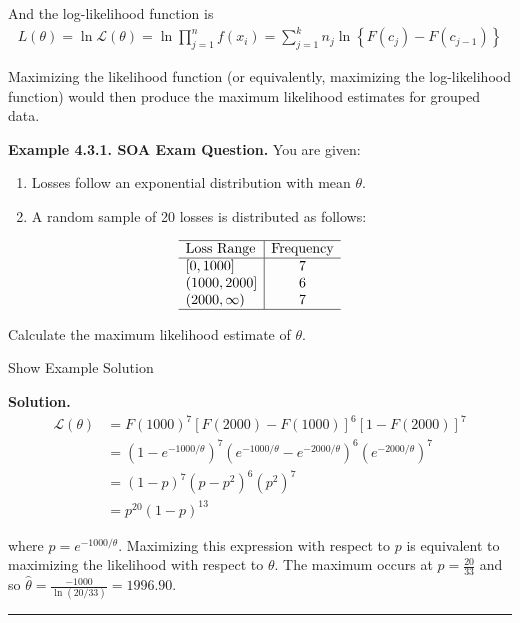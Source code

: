 \documentclass[]{book}
\providecommand{\tightlist}{%
  \setlength{\itemsep}{0pt}\setlength{\parskip}{0pt}}
\theoremstyle{definition}
\theoremstyle{definition}
\theoremstyle{definition}
\theoremstyle{remark}
\begin{document}
And the log-likelihood function is \[\begin{aligned}
L(\theta) = \ln \mathcal{L}(\theta) = \ln \prod_{j=1}^n f(x_i) = \sum_{j=1}^k n_j \ln \left\{F(c_j) - F(c_{j-1})\right\}
\end{aligned}\]

Maximizing the likelihood function (or equivalently, maximizing the
log-likelihood function) would then produce the maximum likelihood
estimates for grouped data.

\textbf{Example 4.3.1. SOA Exam Question.} You are given:

\begin{enumerate}
\def\labelenumi{(\roman{enumi})}
\tightlist
\item
  Losses follow an exponential distribution with mean \(\theta\).
\item
  A random sample of 20 losses is distributed as follows:
\end{enumerate}

\[\begin{array}{l|c}
\hline
\text{Loss Range} & \text{Frequency} \\
\hline 
[0,1000] & 7 \\
(1000,2000] & 6 \\
(2000,\infty) & 7 \\
\hline
\end{array}\]

Calculate the maximum likelihood estimate of \(\theta\).

Show Example Solution

\hypertarget{toggleExampleSelect.3.1}{}
\textbf{Solution.} \[\begin{aligned}
\mathcal{L}(\theta) &= F(1000)^7[F(2000)-F(1000)]^6[1-F(2000)]^7 \\
&= (1-e^{-1000/\theta})^7(e^{-1000/\theta} - e^{-2000/\theta})^6(e^{-2000/\theta})^7 \\
&= (1-p)^7(p-p^2)^6(p^2)^7 \\
&= p^{20}(1-p)^{13}
\end{aligned}\]

where \(p=e^{-1000/\theta}\). Maximizing this expression with respect to
\(p\) is equivalent to maximizing the likelihood with respect to
\(\theta\). The maximum occurs at \(p=\frac{20}{33}\) and so
\(\hat{\theta}=\frac{-1000}{\ln(20/33)}= 1996.90\).

\begin{center}\rule{0.5\linewidth}{\linethickness}\end{center}
\end{document}
